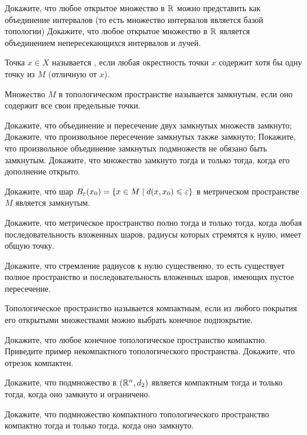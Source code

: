 \documentclass[a4paper,10pt]{article}
\begin{document}
    Докажите, что любое открытое множество в $\mathbb{R}$ можно представить как объединение интервалов (то есть множество интервалов является  базой топологии)
    Докажите, что любое открытое множество в $\mathbb{R}$ является объединением непересекающихся интервалов и лучей.


Точка $x\in X$ называется , если любая окрестность точки $x$ содержит хотя бы одну точку из $M$ (отличную от $x$).

Множество $M$ в топологическом пространстве называется  замкнутым, если оно содержит все свои предельные точки.

    Докажите, что объединение и пересечение двух замкнутых множеств замкнуто;
    Докажите, что произвольное пересечение замкнутых также замкнуто;
    Покажите, что произвольное объединение замкнутых подмножеств не обязано быть замкнутым.
    Докажите, что множество замкнуто тогда и только тогда, когда его дополнение открыто.


    Докажите, что шар $B_\varepsilon(x_0)=\left\{x\in M\mid d(x,x_0)\leqslant\varepsilon\right\}$ в метрическом пространстве $M$ является замкнутым.


    Докажите, что метрическое пространство полно тогда и только тогда, когда любая последовательность вложенных шаров, радиусы которых стремятся к нулю, имеет общую точку.

    Докажите, что стремление радиусов к нулю существенно, то есть существует полное пространство и последовательность вложенных шаров, имеющих пустое пересечение.\\


    Топологическое пространство называется  компактным, если из любого покрытия его открытыми множествами можно выбрать конечное подпокрытие.


    Докажите, что любое конечное топологическое пространство компактно.
    Приведите пример некомпактного топологического пространства.
    Докажите, что отрезок компактен.

    Докажите, что подмножество в $(\mathbb{R}^n,d_2)$ является компактным тогда и только тогда, когда оно замкнуто и ограничено.


    Докажите, что подмножество компактного топологического пространство компактно тогда и только тогда, когда оно замкнуто.
\end{document}

